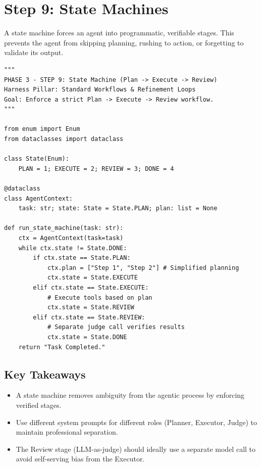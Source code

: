 \section{Step 9: State Machines}
A state machine forces an agent into programmatic, verifiable stages. This prevents the agent from skipping planning, rushing to action, or forgetting to validate its output.

\begin{lstlisting}[caption={step9\_state\_machine.py}, label={lst:step9}]
"""
PHASE 3 - STEP 9: State Machine (Plan -> Execute -> Review)
Harness Pillar: Standard Workflows & Refinement Loops
Goal: Enforce a strict Plan -> Execute -> Review workflow.
"""

from enum import Enum
from dataclasses import dataclass

class State(Enum):
    PLAN = 1; EXECUTE = 2; REVIEW = 3; DONE = 4

@dataclass
class AgentContext:
    task: str; state: State = State.PLAN; plan: list = None

def run_state_machine(task: str):
    ctx = AgentContext(task=task)
    while ctx.state != State.DONE:
        if ctx.state == State.PLAN:
            ctx.plan = ["Step 1", "Step 2"] # Simplified planning
            ctx.state = State.EXECUTE
        elif ctx.state == State.EXECUTE:
            # Execute tools based on plan
            ctx.state = State.REVIEW
        elif ctx.state == State.REVIEW:
            # Separate judge call verifies results
            ctx.state = State.DONE
    return "Task Completed."
\end{lstlisting}

\subsection*{Key Takeaways}
\begin{itemize}
    \item A state machine removes ambiguity from the agentic process by enforcing verified stages.
    \item Use different system prompts for different roles (Planner, Executor, Judge) to maintain professional separation.
    \item The Review stage (LLM-as-judge) should ideally use a separate model call to avoid self-serving bias from the Executor.
\end{itemize}
